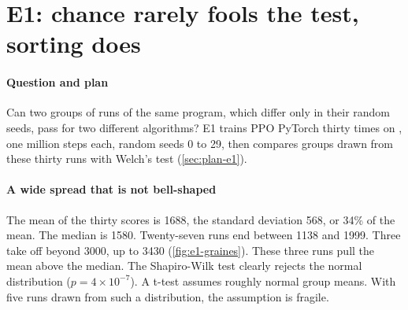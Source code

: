 \section{E1: chance rarely fools the test, sorting does}\label{sec:e1}

\paragraph{Question and plan}
Can two groups of runs of the same program, which differ only in their random seeds, pass for two different
algorithms? E1 trains PPO PyTorch thirty times on , one million steps each, random seeds
0 to 29, then compares groups drawn from these thirty runs with Welch's test (\cref{sec:plan-e1}).

\paragraph{A wide spread that is not bell-shaped}
The mean of the thirty scores is \num{1688}, the standard deviation 568, or 34\% of the mean. The median is
\num{1580}. Twenty-seven runs end between \num{1138} and \num{1999}. Three take off beyond \num{3000}, up to
\num{3430} (\cref{fig:e1-graines}). These three runs pull the mean above the median. The Shapiro-Wilk test
clearly rejects the normal distribution ($p = 4\times10^{-7}$). A t-test assumes roughly normal group means.
With five runs drawn from such a distribution, the assumption is fragile.


